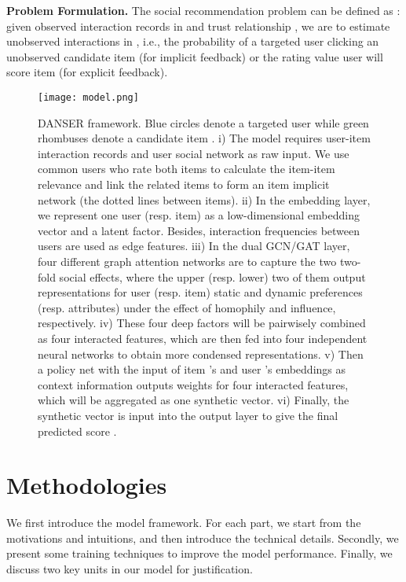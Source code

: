 \documentclass[sigconf]{acmart}
\begin{document}
\textbf{Problem Formulation.} The social recommendation problem can be defined as \cite{review}: given observed interaction records in  and trust relationship , we are to estimate unobserved interactions in , i.e., the probability of a targeted user  clicking an unobserved candidate item  (for implicit feedback) or the rating value user  will score item  (for explicit feedback).

\begin{figure*}[h]
	\centering
	\texttt{[image: model.png]}
	\caption{DANSER framework. Blue circles denote a targeted user  while green rhombuses denote a candidate item .  
	i) The model requires user-item interaction records and user social network as raw input. 
	We use common users who rate both items to calculate the item-item relevance and link the related items to form an item implicit network (the dotted lines between items). 
	ii) In the embedding layer, we represent one user (resp. item) as a low-dimensional embedding vector and a latent factor. Besides, interaction frequencies between users are used as edge features. iii) In the dual GCN/GAT layer, four different graph attention networks are to capture the two two-fold social effects, where the upper (resp. lower) two of them output representations for user (resp. item) static and dynamic preferences (resp. attributes) under the effect of homophily and influence, respectively. 
	iv) These four deep factors will be pairwisely combined as four interacted features, which are then fed into four independent neural networks to obtain more condensed representations. 
	v) Then a policy net with the input of item 's and user 's embeddings as context information outputs weights for four interacted features, which will be aggregated as one synthetic vector. 
	vi) Finally, the synthetic vector is input into the output layer to give the final predicted score .}
	\label{fig-framework}
	\vspace{-10pt}
\end{figure*}

\section{Methodologies}

We first introduce the model framework. For each part, we start from the motivations and intuitions, and then introduce the technical details.
Secondly, we present some training techniques to improve the model performance. 
Finally, we discuss two key units in our model for justification.
\end{document}
